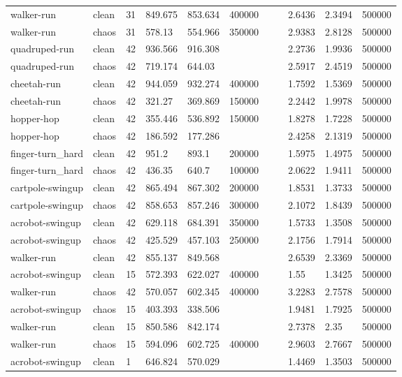 \begin{tabular}{lllllllllll}
walker-run & clean & 31 & 849.675 & 853.634 & 400000 &  &  & 2.6436 & 2.3494 & 500000 \\
walker-run & chaos & 31 & 578.13 & 554.966 & 350000 &  &  & 2.9383 & 2.8128 & 500000 \\
quadruped-run & clean & 42 & 936.566 & 916.308 &  &  &  & 2.2736 & 1.9936 & 500000 \\
quadruped-run & chaos & 42 & 719.174 & 644.03 &  &  &  & 2.5917 & 2.4519 & 500000 \\
cheetah-run & clean & 42 & 944.059 & 932.274 & 400000 &  &  & 1.7592 & 1.5369 & 500000 \\
cheetah-run & chaos & 42 & 321.27 & 369.869 & 150000 &  &  & 2.2442 & 1.9978 & 500000 \\
hopper-hop & clean & 42 & 355.446 & 536.892 & 150000 &  &  & 1.8278 & 1.7228 & 500000 \\
hopper-hop & chaos & 42 & 186.592 & 177.286 &  &  &  & 2.4258 & 2.1319 & 500000 \\
finger-turn\_hard & clean & 42 & 951.2 & 893.1 & 200000 &  &  & 1.5975 & 1.4975 & 500000 \\
finger-turn\_hard & chaos & 42 & 436.35 & 640.7 & 100000 &  &  & 2.0622 & 1.9411 & 500000 \\
cartpole-swingup & clean & 42 & 865.494 & 867.302 & 200000 &  &  & 1.8531 & 1.3733 & 500000 \\
cartpole-swingup & chaos & 42 & 858.653 & 857.246 & 300000 &  &  & 2.1072 & 1.8439 & 500000 \\
acrobot-swingup & clean & 42 & 629.118 & 684.391 & 350000 &  &  & 1.5733 & 1.3508 & 500000 \\
acrobot-swingup & chaos & 42 & 425.529 & 457.103 & 250000 &  &  & 2.1756 & 1.7914 & 500000 \\
walker-run & clean & 42 & 855.137 & 849.568 &  &  &  & 2.6539 & 2.3369 & 500000 \\
acrobot-swingup & clean & 15 & 572.393 & 622.027 & 400000 &  &  & 1.55 & 1.3425 & 500000 \\
walker-run & chaos & 42 & 570.057 & 602.345 & 400000 &  &  & 3.2283 & 2.7578 & 500000 \\
acrobot-swingup & chaos & 15 & 403.393 & 338.506 &  &  &  & 1.9481 & 1.7925 & 500000 \\
walker-run & clean & 15 & 850.586 & 842.174 &  &  &  & 2.7378 & 2.35 & 500000 \\
walker-run & chaos & 15 & 594.096 & 602.725 & 400000 &  &  & 2.9603 & 2.7667 & 500000 \\
acrobot-swingup & clean & 1 & 646.824 & 570.029 &  &  &  & 1.4469 & 1.3503 & 500000 \\

\end{tabular}
